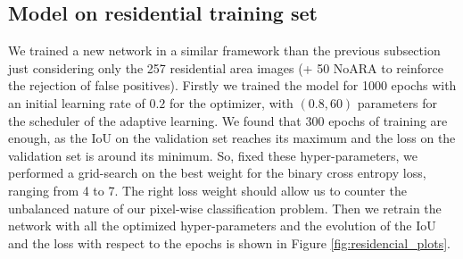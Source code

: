 \documentclass[9pt,conference,compsocconf]{IEEEtran}
\begin{document}
\subsection{Model on residential training set}
We trained a new network in a similar framework than the previous subsection just considering only the 257 residential area images (+ 50 NoARA to reinforce the rejection of false positives). Firstly we trained the model for 1000 epochs with an initial learning rate of $0.2$ for the optimizer, with $(0.8,60)$ parameters for the scheduler of the adaptive learning. We found that 300 epochs of training are enough, as the IoU on the validation set reaches its maximum and the loss on the validation set is around its minimum. So, fixed these hyper-parameters, we performed a grid-search on the best weight for the binary cross entropy loss, ranging from 4 to 7. The right loss weight should allow us to counter the unbalanced nature of our pixel-wise classification problem. Then we retrain the network with all the optimized hyper-parameters and the evolution of the IoU and the loss with respect to the epochs is shown in Figure \ref{fig:residencial_plots}. 
\end{document}
